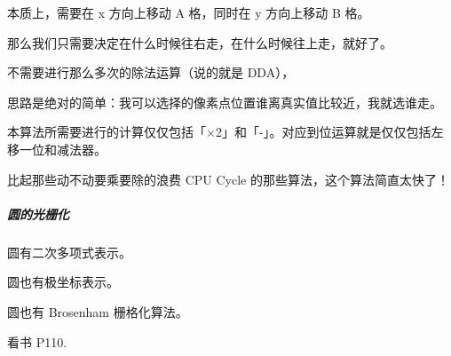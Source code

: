 \documentclass[
]{article}
\begin{document}
本质上，需要在 x 方向上移动 A 格，同时在 y 方向上移动 B 格。

那么我们只需要决定在什么时候往右走，在什么时候往上走，就好了。

不需要进行那么多次的除法运算（说的就是 DDA），

思路是绝对的简单：我可以选择的像素点位置谁离真实值比较近，我就选谁走。

本算法所需要进行的计算仅仅包括「×2」和「-」。对应到位运算就是仅仅包括左移一位和减法器。

比起那些动不动要乘要除的浪费 CPU Cycle 的那些算法，这个算法简直太快了！

\hypertarget{header-n234}{%
\subparagraph{圆的光栅化}\label{header-n234}}

圆有二次多项式表示。

圆也有极坐标表示。

圆也有 Brosenham 栅格化算法。

看书 P110.
\end{document}
